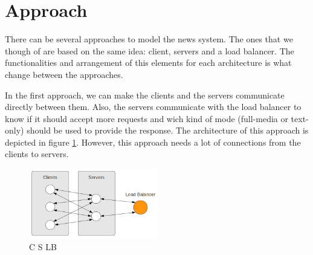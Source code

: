 \documentclass[a4paper]{article}
\begin{document}

%
%
\section{Approach}

There can be several approaches to model the news system. The ones that we
though of are based on the same idea: client, servers and a load balancer. The
functionalities and arrangement of this elements for each architecture is what
change between the approaches.

In the first approach, we can make the clients and the servers communicate
directly between them. Also, the servers communicate with the load balancer to
know if it should accept more requests and wich kind of mode (full-media or
text-only) should be used to provide the response. The architecture of this
approach is depicted in figure \ref{fig:cslb}. However, this approach needs
a lot of connections from the clients to servers.

\begin{figure}[htb]
	\begin{center}
		\includegraphics[width=0.5\textwidth]{images/c_s_lb.png}
	\end{center}
	\caption{C S LB}
	\label{fig:cslb}
\end{figure}
\end{document}

